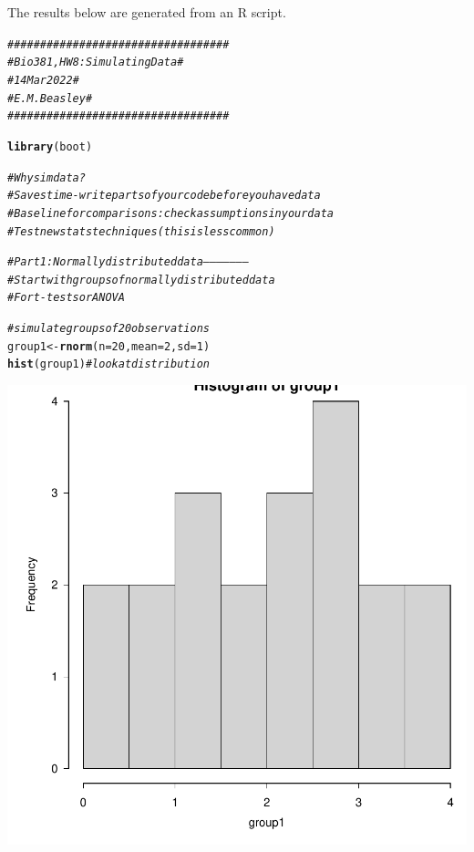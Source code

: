 \documentclass{article}\usepackage[]{graphicx}\usepackage[]{color}
\makeatletter
\newcommand{\hlnum}[1]{\textcolor[rgb]{0.686,0.059,0.569}{#1}}%
\newcommand{\hlcom}[1]{\textcolor[rgb]{0.678,0.584,0.686}{\textit{#1}}}%
\newcommand{\hlstd}[1]{\textcolor[rgb]{0.345,0.345,0.345}{#1}}%
\newcommand{\hlkwb}[1]{\textcolor[rgb]{0.69,0.353,0.396}{#1}}%
\newcommand{\hlkwc}[1]{\textcolor[rgb]{0.333,0.667,0.333}{#1}}%
\newcommand{\hlkwd}[1]{\textcolor[rgb]{0.737,0.353,0.396}{\textbf{#1}}}%
\newenvironment{kframe}{%
 \def\at@end@of@kframe{}%
 \ifinner\ifhmode%
  \def\at@end@of@kframe{\end{minipage}}%
  \begin{minipage}{\columnwidth}%
 \fi\fi%
 \def\FrameCommand##1{\hskip\@totalleftmargin \hskip-\fboxsep
 \colorbox{shadecolor}{##1}\hskip-\fboxsep
     \hskip-\linewidth \hskip-\@totalleftmargin \hskip\columnwidth}%
 \MakeFramed {\advance\hsize-\width
   \@totalleftmargin\z@ \linewidth\hsize
   \@setminipage}}%
 {\par\unskip\endMakeFramed%
 \at@end@of@kframe}
\newenvironment{knitrout}{}{} %
\makeatother
\begin{document}
\title{\title{\title{\title{\title{}}}}}



\maketitle
The results below are generated from an R script.

\begin{knitrout}
\color{fgcolor}\begin{kframe}
\begin{alltt}
\hlcom{##################################}
\hlcom{# Bio 381, HW 8: Simulating Data #}
\hlcom{# 14 Mar 2022                    #}
\hlcom{# E.M. Beasley                   #}
\hlcom{##################################}

\hlkwd{library}\hlstd{(boot)}

\hlcom{# Why sim data?}
\hlcom{# Saves time- write parts of your code before you have data}
\hlcom{# Baseline for comparisons: check assumptions in your data}
\hlcom{# Test new stats techniques (this is less common)}

\hlcom{# Part 1: Normally distributed data ---------------------}
\hlcom{# Start with groups of normally distributed data}
\hlcom{# For t-tests or ANOVA}

\hlcom{# simulate groups of 20 observations}
\hlstd{group1} \hlkwb{<-} \hlkwd{rnorm}\hlstd{(}\hlkwc{n} \hlstd{=} \hlnum{20}\hlstd{,} \hlkwc{mean} \hlstd{=} \hlnum{2}\hlstd{,} \hlkwc{sd} \hlstd{=} \hlnum{1}\hlstd{)}
\hlkwd{hist}\hlstd{(group1)} \hlcom{# look at distribution}
\end{alltt}
\end{kframe}

{\centering \includegraphics[width=.6\linewidth]{figure/Tutorial08-datasims-S2022-Rnwauto-report-1} 

}
\end{knitrout}
\end{document}
